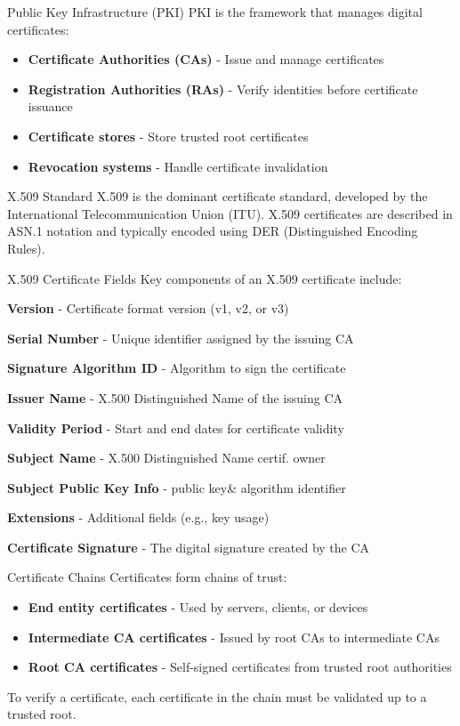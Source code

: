 \begin{concept}{Public Key Infrastructure (PKI)}
PKI is the framework that manages digital certificates:
\begin{itemize}
    \item \textbf{Certificate Authorities (CAs)} - Issue and manage certificates
    \item \textbf{Registration Authorities (RAs)} - Verify identities before certificate issuance
    \item \textbf{Certificate stores} - Store trusted root certificates
    \item \textbf{Revocation systems} - Handle certificate invalidation
\end{itemize}
\end{concept}

\begin{definition}{X.509 Standard}
X.509 is the dominant certificate standard, developed by the International Telecommunication Union (ITU). X.509 certificates are described in ASN.1 notation and typically encoded using DER (Distinguished Encoding Rules).
\end{definition}

\begin{concept}{X.509 Certificate Fields}
Key components of an X.509 certificate include:

\textbf{Version} - Certificate format version (v1, v2, or v3)

\textbf{Serial Number} - Unique identifier assigned by the issuing CA

\textbf{Signature Algorithm ID} - Algorithm to sign the certificate

\textbf{Issuer Name} - X.500 Distinguished Name of the issuing CA

\textbf{Validity Period} - Start and end dates for certificate validity

\textbf{Subject Name} - X.500 Distinguished Name certif. owner

\textbf{Subject Public Key Info} - public key\& algorithm identifier

\textbf{Extensions} - Additional fields (e.g., key usage)

\textbf{Certificate Signature} - The digital signature created by the CA

\end{concept}


\begin{definition}{Certificate Chains}
Certificates form chains of trust:
\begin{itemize}
    \item \textbf{End entity certificates} - Used by servers, clients, or devices
    \item \textbf{Intermediate CA certificates} - Issued by root CAs to intermediate CAs
    \item \textbf{Root CA certificates} - Self-signed certificates from trusted root authorities
\end{itemize}
To verify a certificate, each certificate in the chain must be validated up to a trusted root.
\end{definition}

